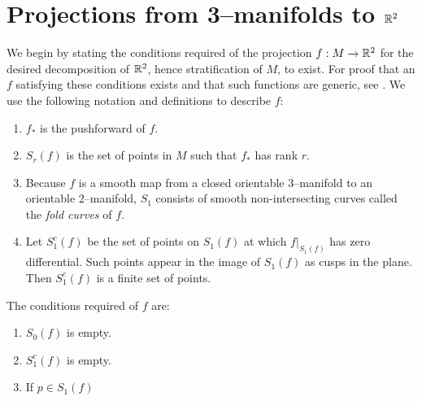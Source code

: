 \section{Projections from 3--manifolds to $\mathbb{R}^2$}
\label{section:smooth-projection}

We begin by stating the conditions required of the projection $f:M\to\mathbb{R}^2$ for the desired decomposition of $\mathbb{R}^2$, hence stratification of $M$, to exist.
For proof that an $f$ satisfying these conditions exists and that such functions are generic, see \cite{Levine65}.
We use the following notation and definitions to describe $f$:
\begin{enumerate}
	\item $f_\ast$ is the pushforward of $f$.
	
	\item $S_r(f)$ is the set of points in $M$ such that $f_\ast$ has rank $r$.
	
	\item Because $f$ is a smooth map from a closed orientable 3--manifold to an orientable 2--manifold, $S_1$ consists of smooth non-intersecting curves called the \emph{fold curves} of $f$.
	
	\item Let $S_1^c(f)$ be the set of points on $S_1(f)$ at which $f|_{S_1(f)}$ has zero differential.
	Such points appear in the image of $S_1(f)$ as cusps in the plane.
	Then $S_1^c(f)$ is a finite set of points.
\end{enumerate}

The conditions required of $f$ are:

\begin{enumerate}
	\item $S_0(f)$ is empty.
	\item $S_1^c(f)$ is empty.
	\item If $p\in S_1(f)$
	
\end{enumerate}